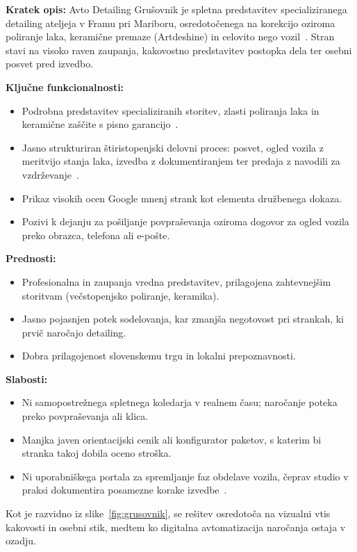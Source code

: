 \documentclass[11pt,a4paper]{article}
\begin{document}
\textbf{Kratek opis:} Avto Detailing Grušovnik je spletna predstavitev specializiranega detailing ateljeja v Framu pri Mariboru, osredotočenega na korekcijo oziroma poliranje laka, keramične premaze (Artdeshine) in celovito nego vozil~\cite{grusovnik}. Stran stavi na visoko raven zaupanja, kakovostno predstavitev postopka dela ter osebni posvet pred izvedbo.

\textbf{Ključne funkcionalnosti:}
\begin{itemize}
  \item Podrobna predstavitev specializiranih storitev, zlasti poliranja laka in keramične zaščite s pisno garancijo~\cite{grusovnik}.
  \item Jasno strukturiran štiristopenjski delovni proces: posvet, ogled vozila z meritvijo stanja laka, izvedba z dokumentiranjem ter predaja z navodili za vzdrževanje~\cite{grusovnik}.
  \item Prikaz visokih ocen Google mnenj strank kot elementa družbenega dokaza.
  \item Pozivi k dejanju za pošiljanje povpraševanja oziroma dogovor za ogled vozila preko obrazca, telefona ali e-pošte.
\end{itemize}

\textbf{Prednosti:}
\begin{itemize}
  \item Profesionalna in zaupanja vredna predstavitev, prilagojena zahtevnejšim storitvam (večstopenjsko poliranje, keramika).
  \item Jasno pojasnjen potek sodelovanja, kar zmanjša negotovost pri strankah, ki prvič naročajo detailing.
  \item Dobra prilagojenost slovenskemu trgu in lokalni prepoznavnosti.
\end{itemize}

\textbf{Slabosti:}
\begin{itemize}
  \item Ni samopostrežnega spletnega koledarja v realnem času; naročanje poteka preko povpraševanja ali klica.
  \item Manjka javen orientacijski cenik ali konfigurator paketov, s katerim bi stranka takoj dobila oceno stroška.
  \item Ni uporabniškega portala za spremljanje faz obdelave vozila, čeprav studio v praksi dokumentira posamezne korake izvedbe~\cite{grusovnik}.
\end{itemize}

Kot je razvidno iz slike~\ref{fig:grusovnik}, se rešitev osredotoča na vizualni vtis kakovosti in osebni stik, medtem ko digitalna avtomatizacija naročanja ostaja v ozadju.
\end{document}
